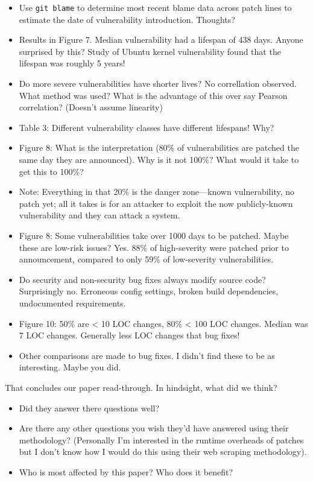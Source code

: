 \documentclass[11pt]{article}
\begin{document}
\begin{itemize}
    \item Use \texttt{git blame} to determine most recent blame data across patch lines to estimate the date of vulnerability introduction. Thoughts?
    \item Results in Figure 7. Median vulnerability had a lifespan of 438 days. Anyone surprised by this? Study of Ubuntu kernel vulnerability found that the lifespan was roughly 5 years!
    \item Do more severe vulnerabilities have shorter lives? No correllation observed. What method was used? What is the advantage of this over say Pearson correlation? (Doesn't assume linearity)
    \item Table 3: Different vulnerability classes have different lifespans! Why?
    \item Figure 8: What is the interpretation (80\% of vulnerabilities are patched the same day they are announced). Why is it not 100\%? What would it take to get this to 100\%?
    \item Note: Everything in that 20\% is the danger zone---known vulnerability, no patch yet; all it takes is for an attacker to exploit the now publicly-known vulnerability and they can attack a system. 
    \item Figure 8: Some vulnerabilities take over 1000 days to be patched. Maybe these are low-risk issues? Yes. 88\% of high-severity were patched prior to announcement, compared to only 59\% of low-severity vulnerabilities.
    \item Do security and non-security bug fixes always modify source code? Surprisingly no. Erroneous config settings, broken build dependencies, undocumented requirements. 
    \item Figure 10: 50\% are < 10 LOC changes, 80\% < 100 LOC changes. Median was 7 LOC changes. Generally less LOC changes that bug fixes!
    \item Other comparisons are made to bug fixes. I didn't find these to be as interesting. Maybe you did. 
\end{itemize}

That concludes our paper read-through. In hindsight, what did we think?
\begin{itemize}
    \item Did they answer there questions well?
    \item Are there any other questions you wish they'd have answered using their methodology? (Personally I'm interested in the runtime overheads of patches but I don't know how I would do this using their web scraping methodology).
    \item Who is most affected by this paper? Who does it benefit?
\end{itemize}
\end{document}
